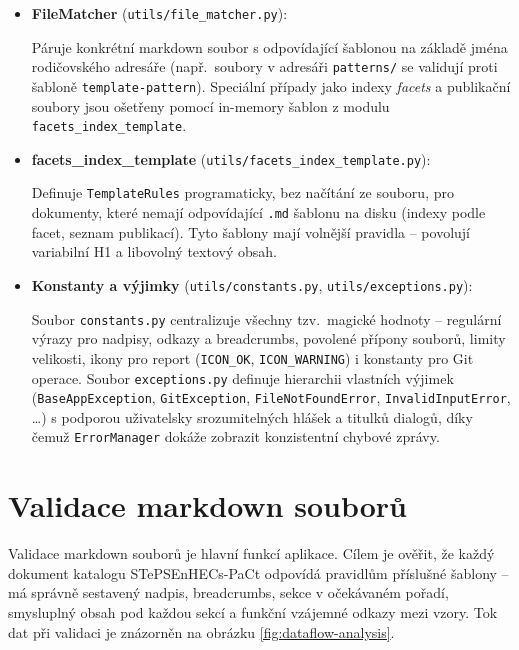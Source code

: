 \documentclass[12pt, a4paper]{article}
\begin{document}
\begin{itemize}
\begin{itemize}
        \item \textbf{FileMatcher} (\texttt{utils/file\_matcher.py}):

        Páruje konkrétní markdown soubor s odpovídající šablonou na základě jména rodičovského
        adresáře (např.\ soubory v adresáři \texttt{patterns/} se validují proti šabloně
        \texttt{template-pattern}). Speciální případy jako indexy \emph{facets} a publikační
        soubory jsou ošetřeny pomocí in-memory šablon z modulu \texttt{facets\_index\_template}.

        \item \textbf{facets\_index\_template} (\texttt{utils/facets\_index\_template.py}):

        Definuje \texttt{TemplateRules} programaticky, bez načítání ze souboru, pro dokumenty,
        které nemají odpovídající \texttt{.md} šablonu na disku
        (indexy podle facet, seznam publikací). Tyto šablony mají volnější pravidla --
        povolují variabilní H1 a libovolný textový obsah.

        \item \textbf{Konstanty a výjimky} (\texttt{utils/constants.py}, \texttt{utils/exceptions.py}):

        Soubor \texttt{constants.py} centralizuje všechny tzv.\ magické hodnoty -- regulární výrazy
        pro nadpisy, odkazy a breadcrumbs, povolené přípony souborů, limity velikosti, ikony pro
        report (\texttt{ICON\_OK}, \texttt{ICON\_WARNING}) i konstanty pro Git operace.
        Soubor \texttt{exceptions.py} definuje hierarchii vlastních výjimek
        (\texttt{BaseAppException}, \texttt{GitException}, \texttt{FileNotFoundError},
        \texttt{InvalidInputError}, \ldots) s podporou uživatelsky srozumitelných hlášek a titulků
        dialogů, díky čemuž \texttt{ErrorManager} dokáže zobrazit konzistentní chybové zprávy.
    \end{itemize}
\end{itemize}

\section{Validace markdown souborů}

Validace markdown souborů je hlavní funkcí aplikace. Cílem je ověřit, že každý dokument
katalogu STePSEnHECs-PaCt odpovídá pravidlům příslušné šablony -- má správně sestavený
nadpis, breadcrumbs, sekce v očekávaném pořadí, smysluplný obsah pod každou sekcí a funkční
vzájemné odkazy mezi vzory. Tok dat při validaci je znázorněn na obrázku
\ref{fig:dataflow-analysis}.
\end{document}
